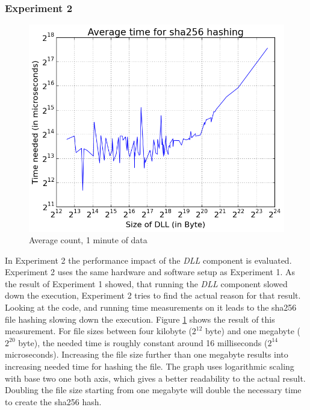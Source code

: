 \subsubsection{Experiment 2}
\begin{figure}[htbp]
	\centering
    \includegraphics[width=\textwidth,height=0.45\textheight,keepaspectratio]{Evaluation/experiment2/result.png}
    \caption{Average count, 1 minute of data}
    \label{fig:ex2_result}
\end{figure}
In Experiment 2 the performance impact of the \emph{\gls{DLL}} component is evaluated. Experiment 2 uses the same hardware and software setup as Experiment 1. As the result of Experiment 1 showed, that running the \emph{\gls{DLL}} component slowed down the execution, Experiment 2 tries to find the actual reason for that result. Looking at the code, and running time measurements on it leads to the sha256 file hashing slowing down the execution. Figure \ref{fig:ex2_result} shows the result of this measurement. For file sizes between four kilobyte ($2^{12}$ byte) and one megabyte ($2^{20}$ byte), the needed time is roughly constant around 16 milliseconds ($2^{14}$ microseconds). Increasing the file size further than one megabyte results into increasing needed time for hashing the file. The graph uses logarithmic scaling with base two one both axis, which gives a better readability to the actual result. Doubling the file size starting from one megabyte will double the necessary time to create the sha256 hash.